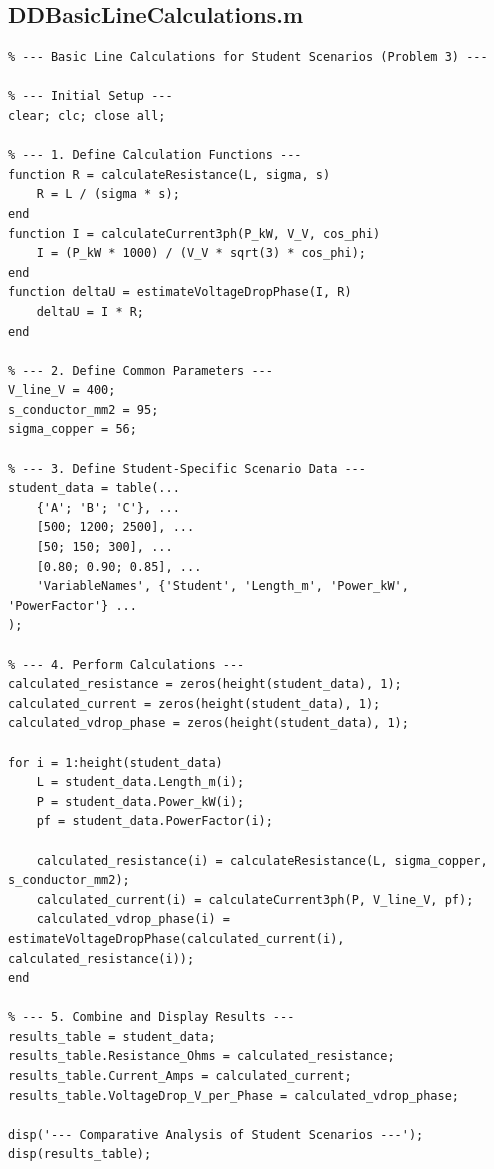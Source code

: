 \documentclass[12pt, a4paper]{article}
\begin{document}
\subsection{DDBasicLineCalculations.m}
\begin{lstlisting}
% --- Basic Line Calculations for Student Scenarios (Problem 3) ---

% --- Initial Setup ---
clear; clc; close all;

% --- 1. Define Calculation Functions ---
function R = calculateResistance(L, sigma, s)
    R = L / (sigma * s);
end
function I = calculateCurrent3ph(P_kW, V_V, cos_phi)
    I = (P_kW * 1000) / (V_V * sqrt(3) * cos_phi);
end
function deltaU = estimateVoltageDropPhase(I, R)
    deltaU = I * R;
end

% --- 2. Define Common Parameters ---
V_line_V = 400;
s_conductor_mm2 = 95;
sigma_copper = 56;

% --- 3. Define Student-Specific Scenario Data ---
student_data = table(...
    {'A'; 'B'; 'C'}, ...
    [500; 1200; 2500], ...
    [50; 150; 300], ...
    [0.80; 0.90; 0.85], ...
    'VariableNames', {'Student', 'Length_m', 'Power_kW', 'PowerFactor'} ...
);

% --- 4. Perform Calculations ---
calculated_resistance = zeros(height(student_data), 1);
calculated_current = zeros(height(student_data), 1);
calculated_vdrop_phase = zeros(height(student_data), 1);

for i = 1:height(student_data)
    L = student_data.Length_m(i);
    P = student_data.Power_kW(i);
    pf = student_data.PowerFactor(i);
    
    calculated_resistance(i) = calculateResistance(L, sigma_copper, s_conductor_mm2);
    calculated_current(i) = calculateCurrent3ph(P, V_line_V, pf);
    calculated_vdrop_phase(i) = estimateVoltageDropPhase(calculated_current(i), calculated_resistance(i));
end

% --- 5. Combine and Display Results ---
results_table = student_data;
results_table.Resistance_Ohms = calculated_resistance;
results_table.Current_Amps = calculated_current;
results_table.VoltageDrop_V_per_Phase = calculated_vdrop_phase;

disp('--- Comparative Analysis of Student Scenarios ---');
disp(results_table);
\end{lstlisting}
\end{document}
